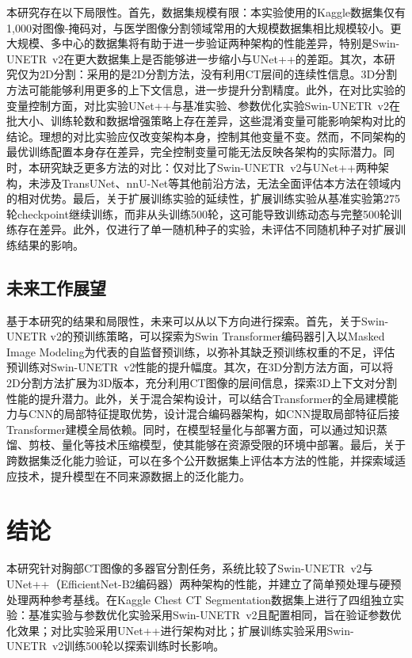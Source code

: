 \documentclass[12pt, a4paper]{article}
\begin{document}
本研究存在以下局限性。首先，数据集规模有限：本实验使用的Kaggle数据集仅有1,000对图像-掩码对，与医学图像分割领域常用的大规模数据集相比规模较小。更大规模、多中心的数据集将有助于进一步验证两种架构的性能差异，特别是Swin-UNETR~v2在更大数据集上是否能够进一步缩小与UNet++的差距。其次，本研究仅为2D分割：采用的是2D分割方法，没有利用CT层间的连续性信息。3D分割方法可能能够利用更多的上下文信息，进一步提升分割精度。此外，在对比实验的变量控制方面，对比实验UNet++与基准实验、参数优化实验Swin-UNETR~v2在批大小、训练轮数和数据增强策略上存在差异，这些混淆变量可能影响架构对比的结论。理想的对比实验应仅改变架构本身，控制其他变量不变。然而，不同架构的最优训练配置本身存在差异，完全控制变量可能无法反映各架构的实际潜力。同时，本研究缺乏更多方法的对比：仅对比了Swin-UNETR~v2与UNet++两种架构，未涉及TransUNet、nnU-Net等其他前沿方法，无法全面评估本方法在领域内的相对优势。最后，关于扩展训练实验的延续性，扩展训练实验从基准实验第275轮checkpoint继续训练，而非从头训练500轮，这可能导致训练动态与完整500轮训练存在差异。此外，仅进行了单一随机种子的实验，未评估不同随机种子对扩展训练结果的影响。

\subsection{未来工作展望}

基于本研究的结果和局限性，未来可以从以下方向进行探索。首先，关于Swin-UNETR v2的预训练策略，可以探索为Swin Transformer编码器引入以Masked Image Modeling为代表的自监督预训练，以弥补其缺乏预训练权重的不足，评估预训练对Swin-UNETR~v2性能的提升幅度。其次，在3D分割方法方面，可以将2D分割方法扩展为3D版本，充分利用CT图像的层间信息，探索3D上下文对分割性能的提升潜力。此外，关于混合架构设计，可以结合Transformer的全局建模能力与CNN的局部特征提取优势，设计混合编码器架构，如CNN提取局部特征后接Transformer建模全局依赖。同时，在模型轻量化与部署方面，可以通过知识蒸馏、剪枝、量化等技术压缩模型，使其能够在资源受限的环境中部署。最后，关于跨数据集泛化能力验证，可以在多个公开数据集上评估本方法的性能，并探索域适应技术，提升模型在不同来源数据上的泛化能力。

\section{结论}
\label{sec:conclusion}

本研究针对胸部CT图像的多器官分割任务，系统比较了Swin-UNETR~v2与UNet++（EfficientNet-B2编码器）两种架构的性能，并建立了简单预处理与硬预处理两种参考基线。在Kaggle Chest CT Segmentation数据集上进行了四组独立实验：基准实验与参数优化实验采用Swin-UNETR~v2且配置相同，旨在验证参数优化效果；对比实验采用UNet++进行架构对比；扩展训练实验采用Swin-UNETR~v2训练500轮以探索训练时长影响。
\end{document}
